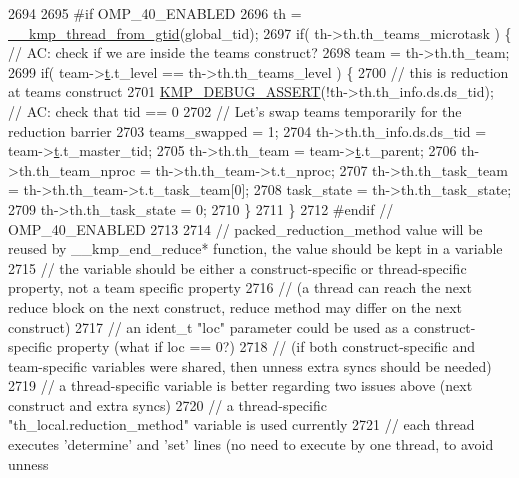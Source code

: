 \begin{DoxyCode}
{2694 \textcolor{preprocessor}{}
2695 \textcolor{preprocessor}{#if OMP\_40\_ENABLED}
2696 \textcolor{preprocessor}{}    th = \hyperlink{kmp_8h_a1626e286e4eb82742a397442009721e6}{\_\_kmp\_thread\_from\_gtid}(global\_tid);
2697     \textcolor{keywordflow}{if}( th->th.th\_teams\_microtask ) \{   \textcolor{comment}{// AC: check if we are inside the teams construct?}
2698         team = th->th.th\_team;
2699         \textcolor{keywordflow}{if}( team->\hyperlink{unionkmp__team_a87cf4571108a61b446e809094f8c0362}{t}.t\_level == th->th.th\_teams\_level ) \{
2700             \textcolor{comment}{// this is reduction at teams construct}
2701             \hyperlink{kmp__debug_8h_ad766efc30e33e28634691088e80cdf08}{KMP\_DEBUG\_ASSERT}(!th->th.th\_info.ds.ds\_tid);  \textcolor{comment}{// AC: check that tid == 0}
2702             \textcolor{comment}{// Let's swap teams temporarily for the reduction barrier}
2703             teams\_swapped = 1;
2704             th->th.th\_info.ds.ds\_tid = team->\hyperlink{unionkmp__team_a87cf4571108a61b446e809094f8c0362}{t}.t\_master\_tid;
2705             th->th.th\_team = team->\hyperlink{unionkmp__team_a87cf4571108a61b446e809094f8c0362}{t}.t\_parent;
2706             th->th.th\_team\_nproc = th->th.th\_team->t.t\_nproc;
2707             th->th.th\_task\_team = th->th.th\_team->t.t\_task\_team[0];
2708             task\_state = th->th.th\_task\_state;
2709             th->th.th\_task\_state = 0;
2710         \}
2711     \}
2712 \textcolor{preprocessor}{#endif // OMP\_40\_ENABLED}
2713 \textcolor{preprocessor}{}
2714     \textcolor{comment}{// packed\_reduction\_method value will be reused by \_\_kmp\_end\_reduce* function, the value should be kept
       in a variable}
2715     \textcolor{comment}{// the variable should be either a construct-specific or thread-specific property, not a team specific
       property}
2716     \textcolor{comment}{//     (a thread can reach the next reduce block on the next construct, reduce method may differ on the
       next construct)}
2717     \textcolor{comment}{// an ident\_t "loc" parameter could be used as a construct-specific property (what if loc == 0?)}
2718     \textcolor{comment}{//     (if both construct-specific and team-specific variables were shared, then unness extra syncs
       should be needed)}
2719     \textcolor{comment}{// a thread-specific variable is better regarding two issues above (next construct and extra syncs)}
2720     \textcolor{comment}{// a thread-specific "th\_local.reduction\_method" variable is used currently}
2721     \textcolor{comment}{// each thread executes 'determine' and 'set' lines (no need to execute by one thread, to avoid unness
}}
\end{DoxyCode}

